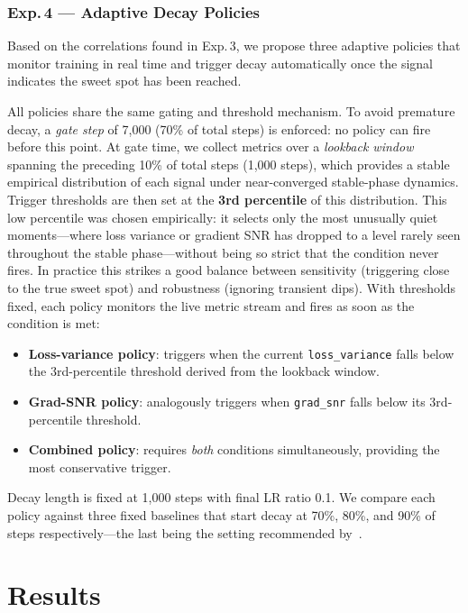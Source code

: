 \documentclass[10pt,conference,compsocconf]{IEEEtran}
\begin{document}
\subsubsection{Exp.\,4 — Adaptive Decay Policies}
Based on the correlations found in Exp.\,3, we propose three adaptive policies
that monitor training in real time and trigger decay automatically once the
signal indicates the sweet spot has been reached.

All policies share the same gating and threshold mechanism.
To avoid premature decay, a \emph{gate step} of 7,000 (70\% of total steps)
is enforced: no policy can fire before this point.
At gate time, we collect metrics over a \emph{lookback window} spanning the
preceding 10\% of total steps (1,000 steps), which provides a stable
empirical distribution of each signal under near-converged stable-phase
dynamics.
Trigger thresholds are then set at the \textbf{3rd percentile} of this
distribution.
This low percentile was chosen empirically: it selects only the most
unusually quiet moments—where loss variance or gradient SNR has dropped to
a level rarely seen throughout the stable phase—without being so strict that
the condition never fires.
In practice this strikes a good balance between sensitivity (triggering
close to the true sweet spot) and robustness (ignoring transient dips).
With thresholds fixed, each policy monitors the live metric stream and fires
as soon as the condition is met:
\begin{itemize}
  \item \textbf{Loss-variance policy}: triggers when the current
        \texttt{loss\_variance} falls below the 3rd-percentile threshold
        derived from the lookback window.
  \item \textbf{Grad-SNR policy}: analogously triggers when \texttt{grad\_snr}
        falls below its 3rd-percentile threshold.
  \item \textbf{Combined policy}: requires \emph{both} conditions
        simultaneously, providing the most conservative trigger.
\end{itemize}
Decay length is fixed at 1,000 steps with final LR ratio 0.1.
We compare each policy against three fixed baselines that start decay at
70\%, 80\%, and 90\% of steps respectively—the last being the setting
recommended by~\citet{wen2024river}.


\section{Results}
\end{document}
